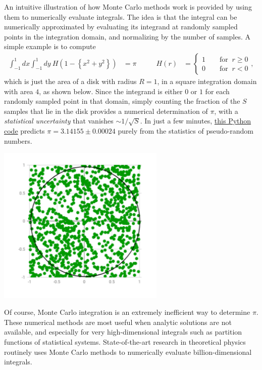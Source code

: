 An intuitive illustration of how Monte Carlo methods work is provided by using them to numerically evaluate integrals.
The idea is that the integral can be numerically approximated by evaluating its integrand at randomly sampled points in the integration domain, and normalizing by the number of samples.
A simple example is to compute
\begin{align*}
  \int_{-1}^1 dx \int_{-1}^1 dy \ H\!\left(1 - \left\{x^2 + y^2\right\}\right) & = \pi \qquad &
  H(r) & = \left\{\begin{array}{l}1 \qquad \mbox{for } \ r \geq 0 \\
                                  0 \qquad \mbox{for } \ r < 0\end{array}\right. ,
\end{align*}
which is just the area of a disk with radius $R = 1$, in a square integration domain with area $4$, as shown below.
Since the integrand is either $0$ or $1$ for each randomly sampled point in that domain, simply counting the fraction of the $S$ samples that lie in the disk provides a numerical determination of $\pi$, with a \textit{statistical uncertainty} that vanishes $\sim 1 / \sqrt{S}$.
In just a few minutes, \href{https://github.com/daschaich/MATH327_2021/blob/master/lecture_notes/week11_pi.py}{this Python code} predicts $\pi = 3.14155 \pm 0.00024$ purely from the statistics of pseudo-random numbers.

\begin{center}\includegraphics[width=0.6\textwidth]{figs/week11_pi.pdf}\end{center}

Of course, Monte Carlo integration is an extremely inefficient way to determine $\pi$.
These numerical methods are most useful when analytic solutions are not available, and especially for very high-dimensional integrals such as partition functions of statistical systems.
State-of-the-art research in theoretical physics routinely uses Monte Carlo methods to numerically evaluate billion-dimensional integrals.

